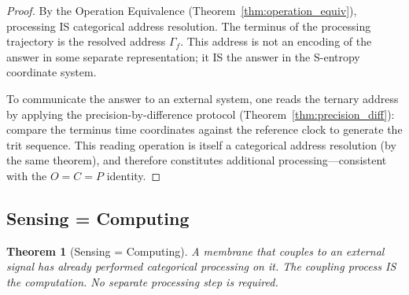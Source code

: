 \documentclass[twocolumn,10pt]{article}
\newtheorem{theorem}{Theorem}[section]
\theoremstyle{remark}
\begin{document}
\begin{proof}
By the Operation Equivalence (Theorem~\ref{thm:operation_equiv}), processing IS categorical address resolution. The terminus of the processing trajectory is the resolved address $\Gamma_f$. This address is not an encoding of the answer in some separate representation; it IS the answer in the S-entropy coordinate system.

To communicate the answer to an external system, one reads the ternary address by applying the precision-by-difference protocol (Theorem~\ref{thm:precision_diff}): compare the terminus time coordinates against the reference clock to generate the trit sequence. This reading operation is itself a categorical address resolution (by the same theorem), and therefore constitutes additional processing---consistent with the $O = C = P$ identity.
\end{proof}

\subsection{Sensing = Computing}

\begin{theorem}[Sensing = Computing]
\label{thm:sensing_computing}
A membrane that couples to an external signal has already performed categorical processing on it. The coupling process IS the computation. No separate processing step is required.
\end{theorem}
\end{document}
